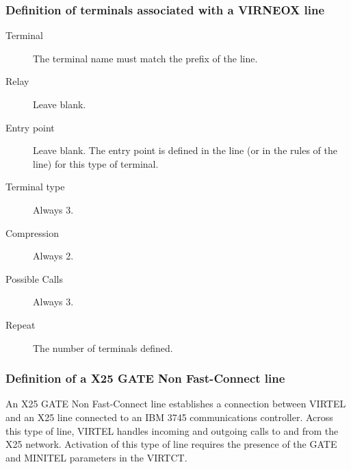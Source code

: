 \documentclass[letterpaper,10pt,english]{sphinxmanual}
\begin{document}
\subsubsection{Definition of terminals associated with a VIRNEOX line}
\label{\detokenize{connectivity_guide:definition-of-terminals-associated-with-a-virneox-line}}\begin{description}
\item[{Terminal}] \leavevmode
The terminal name must match the prefix of the line.

\item[{Relay}] \leavevmode
Leave blank.

\item[{Entry point}] \leavevmode
Leave blank. The entry point is defined in the line (or in the rules of the line) for this type of terminal.

\item[{Terminal type}] \leavevmode
Always 3.

\item[{Compression}] \leavevmode
Always 2.

\item[{Possible Calls}] \leavevmode
Always 3.

\item[{Repeat}] \leavevmode
The number of terminals defined.

\end{description}


\subsubsection{Definition of a X25 GATE Non Fast-Connect line}
\label{\detokenize{connectivity_guide:bookmark94}}\label{\detokenize{connectivity_guide:definition-of-a-x25-gate-non-fast-connect-line}}
An X25 GATE Non Fast-Connect line establishes a connection between VIRTEL and an X25 line connected to an IBM 3745 communications controller. Across this type of line, VIRTEL handles incoming and outgoing calls to and from the X25 network. Activation of this type of line requires the presence of the GATE and MINITEL parameters in the VIRTCT.

\end{document}

